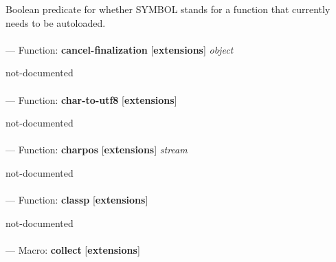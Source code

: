 \begin{adjustwidth}{5em}{5em}
Boolean predicate for whether SYMBOL stands for a function that currently needs to be autoloaded.
\end{adjustwidth}

\paragraph{}
\label{EXTENSIONS:CANCEL-FINALIZATION}
--- Function: \textbf{cancel-finalization} [\textbf{extensions}] \textit{object}

\begin{adjustwidth}{5em}{5em}
not-documented
\end{adjustwidth}

\paragraph{}
\label{EXTENSIONS:CHAR-TO-UTF8}
--- Function: \textbf{char-to-utf8} [\textbf{extensions}] \textit{}

\begin{adjustwidth}{5em}{5em}
not-documented
\end{adjustwidth}

\paragraph{}
\label{EXTENSIONS:CHARPOS}
--- Function: \textbf{charpos} [\textbf{extensions}] \textit{stream}

\begin{adjustwidth}{5em}{5em}
not-documented
\end{adjustwidth}

\paragraph{}
\label{EXTENSIONS:CLASSP}
--- Function: \textbf{classp} [\textbf{extensions}] \textit{}

\begin{adjustwidth}{5em}{5em}
not-documented
\end{adjustwidth}

\paragraph{}
\label{EXTENSIONS:COLLECT}
--- Macro: \textbf{collect} [\textbf{extensions}] \textit{}


